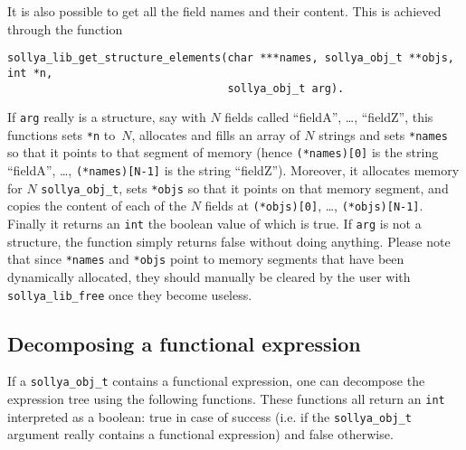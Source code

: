\documentclass[a4paper]{article}
\begin{document}
It is also possible to get all the field names and their content. This is achieved through the function
\begin{center}
\verb|sollya_lib_get_structure_elements(char ***names, sollya_obj_t **objs, int *n,|\\
\verb|                                  sollya_obj_t arg).                         |
\end{center}
If \verb|arg| really is a structure, say with $N$ fields called ``fieldA'', \dots, ``fieldZ'', this functions sets \verb|*n| to~$N$, allocates and fills an array of $N$ strings and sets \verb|*names| so that it points to that segment of memory (hence \verb|(*names)[0]| is the string ``fieldA'', \dots, \verb|(*names)[N-1]| is the string ``fieldZ''). Moreover, it allocates memory for $N$ \verb|sollya_obj_t|, sets \verb|*objs| so that it points on that memory segment, and copies the content of each of the $N$ fields at \verb|(*objs)[0]|, \dots, \verb|(*objs)[N-1]|. Finally it returns an \verb|int| the boolean value of which is true. If \verb|arg| is not a structure, the function simply returns false without doing anything. Please note that since \verb|*names| and \verb|*objs| point to memory segments that have been dynamically allocated, they should manually be cleared by the user with \verb|sollya_lib_free| once they become useless.

\subsection{Decomposing a functional expression}
If a \texttt{sollya\_obj\_t} contains a functional expression, one can decompose the expression tree using the following functions. These functions all return an \verb|int| interpreted as a boolean: true in case of success (i.e. if the \texttt{sollya\_obj\_t} argument really contains a functional expression) and false otherwise.
\end{document}
